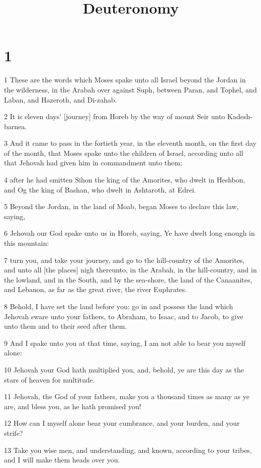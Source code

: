 

\title{Deuteronomy}

\chapter{1}

\par 1 These are the words which Moses spake unto all Israel beyond the Jordan in the wilderness, in the Arabah over against Suph, between Paran, and Tophel, and Laban, and Hazeroth, and Di-zahab.
\par 2 It is eleven days' [journey] from Horeb by the way of mount Seir unto Kadesh-barnea.
\par 3 And it came to pass in the fortieth year, in the eleventh month, on the first day of the month, that Moses spake unto the children of Israel, according unto all that Jehovah had given him in commandment unto them;
\par 4 after he had smitten Sihon the king of the Amorites, who dwelt in Heshbon, and Og the king of Bashan, who dwelt in Ashtaroth, at Edrei.
\par 5 Beyond the Jordan, in the land of Moab, began Moses to declare this law, saying,
\par 6 Jehovah our God spake unto us in Horeb, saying, Ye have dwelt long enough in this mountain:
\par 7 turn you, and take your journey, and go to the hill-country of the Amorites, and unto all [the places] nigh thereunto, in the Arabah, in the hill-country, and in the lowland, and in the South, and by the sea-shore, the land of the Canaanites, and Lebanon, as far as the great river, the river Euphrates.
\par 8 Behold, I have set the land before you: go in and possess the land which Jehovah sware unto your fathers, to Abraham, to Isaac, and to Jacob, to give unto them and to their seed after them.
\par 9 And I spake unto you at that time, saying, I am not able to bear you myself alone:
\par 10 Jehovah your God hath multiplied you, and, behold, ye are this day as the stars of heaven for multitude.
\par 11 Jehovah, the God of your fathers, make you a thousand times as many as ye are, and bless you, as he hath promised you!
\par 12 How can I myself alone bear your cumbrance, and your burden, and your strife?
\par 13 Take you wise men, and understanding, and known, according to your tribes, and I will make them heads over you.
